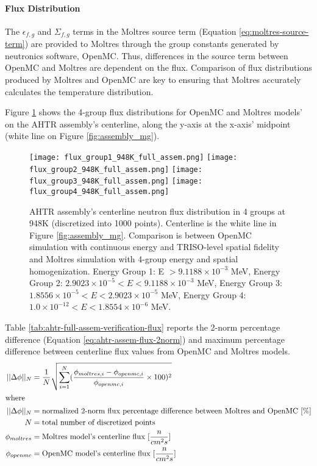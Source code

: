 \paragraph{Flux Distribution}
The $\epsilon_{f,g}$ and $\Sigma_{f,g}$ terms in the Moltres source term (Equation 
\ref{eq:moltres-source-term}) are provided to Moltres through 
the group constants generated by neutronics software, OpenMC.
Thus, differences in the source term between OpenMC and Moltres are dependent on 
the flux. 
Comparison of flux distributions produced by Moltres and OpenMC are key to ensuring 
that Moltres accurately calculates the temperature distribution.

Figure \ref{fig:flux_948K_full_assem} shows the 4-group flux distributions for OpenMC and 
Moltres models' on the \gls{AHTR} assembly's centerline, along the y-axis at 
the x-axis' midpoint (white line on Figure \ref{fig:assembly_mg}). 
\begin{figure}[htbp]
    \centering
    \texttt{[image: flux\_group1\_948K\_full\_assem.png]} 
    \texttt{[image: flux\_group2\_948K\_full\_assem.png]} 
    \texttt{[image: flux\_group3\_948K\_full\_assem.png]} 
    \texttt{[image: flux\_group4\_948K\_full\_assem.png]} 
    \caption{\acrfull{AHTR} assembly's centerline neutron flux distribution 
    in 4 groups at 948K (discretized into 1000 points). 
    Centerline is the white line in Figure \ref{fig:assembly_mg}.
    Comparison is between OpenMC simulation with continuous energy 
    and TRISO-level spatial fidelity and Moltres simulation with 4-group energy and 
    spatial homogenization.
    Energy Group 1: E $> 9.1188 \times 10^{-3}$ MeV, 
    Energy Group 2: $2.9023 \times 10^{-5} < E < 9.1188 \times 10^{-3}$ MeV,
    Energy Group 3:  $1.8556 \times 10^{-5} < E < 2.9023 \times 10^{-5}$ MeV,
    Energy Group 4:  $1.0 \times 10^{-12} < E < 1.8554 \times 10^{-6}$ MeV.}
    \label{fig:flux_948K_full_assem}
\end{figure}
Table \ref{tab:ahtr-full-assem-verification-flux} reports the 2-norm percentage 
difference (Equation \ref{eq:ahtr-assem-flux-2norm}) and maximum percentage 
difference between centerline flux values from OpenMC and Moltres models. 
\begin{align}
    \label{eq:ahtr-assem-flux-2norm}
    ||\Delta \phi||_N &= \frac{1}{N}\sqrt{\sum_{i=1}^N(\frac{\phi_{moltres, i} - \phi_{openmc, i}}{\phi_{openmc, i}}\times100)^2} \\
\intertext{where}
    ||\Delta \phi||_N &= \mbox{normalized 2-norm flux percentage difference between Moltres and OpenMC } [\%] \nonumber \\
    N &= \mbox{total number of discretized points} \nonumber \\
    \phi_{moltres} &= \mbox{Moltres model's centerline flux } [\frac{n}{cm^2s}] \nonumber \\
    \phi_{openmc} &= \mbox{OpenMC model's centerline flux } [\frac{n}{cm^2s}] \nonumber 
\end{align} 
